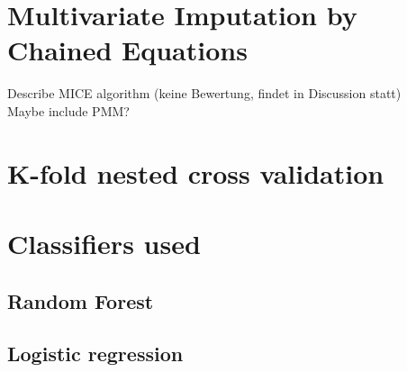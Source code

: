 \section{Multivariate Imputation by Chained Equations}
\begin{changemargin}{50pt}{50pt}
Describe MICE algorithm (keine Bewertung, findet in Discussion statt)
\\
Maybe include PMM?
\end{changemargin}
\section{K-fold nested cross validation}
\section{Classifiers used}
\subsection{Random Forest}
\subsection{Logistic regression}
